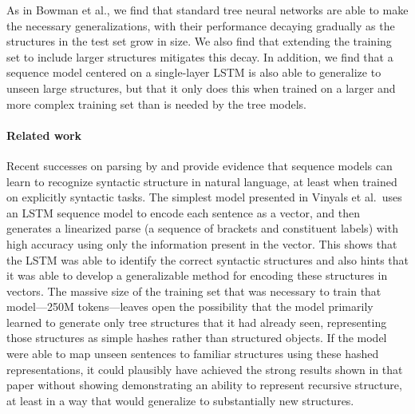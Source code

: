 As in Bowman et al., we find that standard tree neural networks are able to make the necessary generalizations, with their performance decaying gradually as the structures in the test set grow in size. We also find that extending the training set to include larger structures mitigates this decay. In addition, we find that a sequence model centered on a single-layer LSTM is also able to generalize to unseen large structures, but that it only does this when trained on a larger and more complex training set than is needed by the tree models. 

\paragraph{Related work}
Recent successes on parsing by  and  provide evidence that sequence models can learn to recognize syntactic structure in natural language, at least when trained on explicitly syntactic tasks. The simplest model presented in Vinyals et al.~uses an LSTM sequence model to encode each sentence as a vector, and then generates a linearized parse (a sequence of brackets and constituent labels) with high accuracy using only the information present in the vector. This shows that the LSTM was able to identify the correct syntactic structures and also hints that it was able to develop a generalizable method for encoding these structures in vectors. The massive size of the training set that was necessary to train that model---250M tokens---leaves open the possibility that the model primarily learned to generate only tree structures that it had already seen, representing those structures as simple hashes rather than structured objects. If the model were able to map unseen sentences to familiar structures using these hashed representations, it could plausibly have achieved the strong results shown in that paper without showing demonstrating an ability to represent recursive structure, at least in a way that would generalize to substantially new structures.